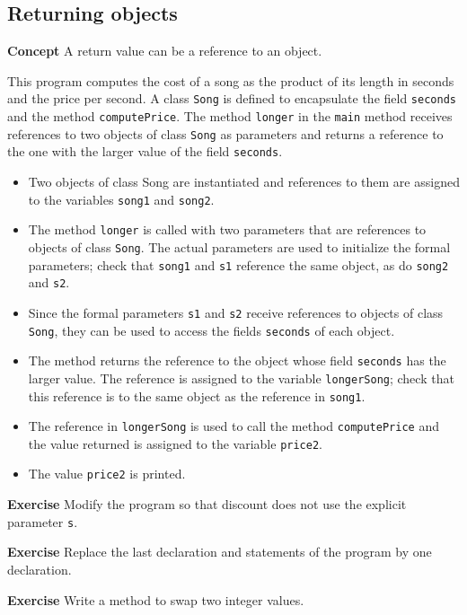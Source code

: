 \subsection{Returning objects}\label{method.08}

\textbf{Concept} A return value can be a reference to an object.


This program computes the cost of a song as the product of its length
in seconds and the price per second. A class \texttt{Song} is defined
to encapsulate the field \texttt{seconds} and the method \texttt{computePrice}.
The method \texttt{longer} in the \texttt{main} method receives references
to two objects of class \texttt{Song} as parameters and returns a reference
to the one with the larger value of the field \texttt{seconds}.

\begin{itemize}
\item Two objects of class Song are instantiated and references to them
are assigned to the variables \texttt{song1} and \texttt{song2}.
\item The method \texttt{longer} is called with two parameters
that are references to objects of class \texttt{Song}.
The actual parameters are used to initialize the formal
parameters; check that \texttt{song1} and \texttt{s1} reference the same object,
as do \texttt{song2} and \texttt{s2}.
\item Since the formal parameters \texttt{s1} and \texttt{s2} receive references to objects
of class \texttt{Song}, they can be used to access the fields \texttt{seconds} of each object.
\item The method returns the reference to the object whose field \texttt{seconds}
has the larger value. The reference is assigned to the variable \texttt{longerSong};
check that this reference is to the same object as the reference in \texttt{song1}.
\item The reference in \texttt{longerSong} is used to call the method \texttt{computePrice}
and the value returned is assigned to the variable \texttt{price2}.
\item The value \texttt{price2} is printed.
\end{itemize}

\textbf{Exercise} Modify the program so that discount does not use the explicit
parameter \texttt{s}.

\textbf{Exercise} Replace the last declaration and statements of the program by one
declaration.

\textbf{Exercise} Write a method to swap two integer values.
